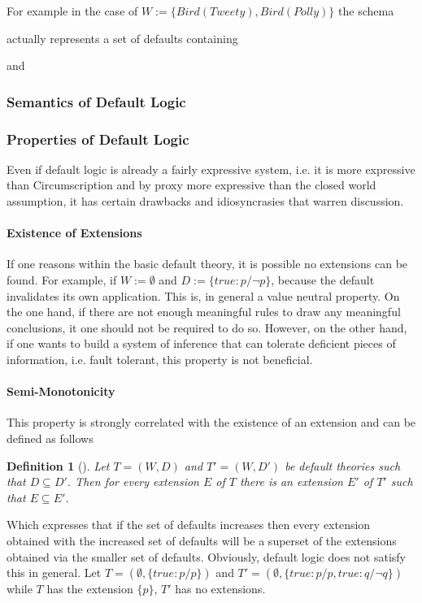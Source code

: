 \documentclass{article}
\newtheorem{mydef}[thm]{Definition}
\begin{document}
For example in the case of $W:=\{Bird(Tweety), Bird(Polly)\}$ the schema 
\begin{prooftree}
\end{prooftree}
actually represents a set of defaults containing 
\begin{prooftree}
\end{prooftree}
and 
\begin{prooftree}
\end{prooftree}

\subsubsection*{Semantics of Default Logic}

 
\subsubsection*{Properties of Default Logic}
Even if default logic is already a fairly expressive system, i.e. it is more expressive than Circumscription and by proxy more expressive than the closed world assumption, it has certain drawbacks and idiosyncrasies that warren discussion. 
\paragraph*{Existence of Extensions}
If one reasons within the basic default theory, it is possible no extensions can be found.
For example, if $W:=\emptyset$ and $D:=\{true:p/\neg p\}$, because the default invalidates its own application. This is, in general a value neutral property. On the one hand, if there are not enough meaningful rules to draw any meaningful conclusions, it one should not be required to do so. However, on the other hand, if one wants to build a system of inference that can tolerate deficient pieces of information, i.e. fault tolerant, this property is not beneficial.
\paragraph*{Semi-Monotonicity}
This property is strongly correlated with the existence of an extension and can be defined as follows
\begin{mydef}[\cite{ANTONIOU2007517}]
Let $T = (W,D)$ and $T' = (W,D')$ be default theories such that $D \subseteq D'$. Then for every extension $E$ of $T$ there is an extension $E'$ of $T'$ such that $E \subseteq E'$.
\end{mydef} 
Which expresses that if the set of defaults increases then every extension obtained with the increased set of defaults will be a superset of the extensions obtained via the smaller set of defaults. Obviously, default logic does not satisfy this in general.
Let $T=(\emptyset, \{true:p/p\})$ and $T'=(\emptyset, \{true:p/p, true:q/\neg q\})$
while $T$ has the extension $\{p\}$, $T'$ has no extensions.
\end{document}

